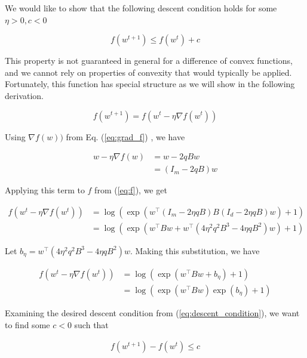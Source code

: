 \documentclass[11pt]{article}
\begin{document}
We would like to show that the following descent condition holds for some $\eta > 0, c < 0$

\begin{equation}
\label{eq:descent_condition}
    f(w^{t+1}) \leq f(w^t) + c
\end{equation}

This property is not guaranteed in general for a difference of convex functions, and we cannot rely on properties of convexity that would typically be applied. Fortunately, this function has special structure as we will show in the following derivation.

\begin{equation}
    f(w^{t+1}) = f(w^t - \eta \nabla f(w^t)) 
\end{equation}

Using $\nabla f(w))$ from Eq. (\ref{eq:grad_f}) , we have

\begin{align*}
    w - \eta \nabla f(w) &= w - 2qBw \\
    &= (I_m - 2qB)w
\end{align*}

Applying this term to $f$ from (\ref{eq:f}), we get

\begin{equation}
\begin{split}
    f(w^t - \eta \nabla f(w^t)) 
    &= \log(\exp(w^{\top}(I_m - 2 \eta qB)B(I_d - 2 \eta qB)w) + 1) \\
    &= \log(\exp(w^{\top}Bw + w^{\top} ( 4 \eta^2 q^2 B^3 - 4 \eta q B^2)w) + 1)
\end{split}
\end{equation}

Let $b_\eta = w^{\top} ( 4 \eta^2 q^2 B^3 - 4 \eta q B^2)w$. Making this substitution, we have

\begin{equation}
\begin{split}
    f(w^t - \eta \nabla f(w^t)) 
    &= \log(\exp(w^{\top}Bw + b_\eta ) + 1) \\
    &= \log(\exp(w^{\top}Bw)\exp(b_\eta ) + 1)
\end{split}
\end{equation}

Examining the desired descent condition from (\ref{eq:descent_condition}), we want to find some $c < 0$ such that

\begin{align*}
    f(w^{t+1}) - f(w^t) \leq c
\end{align*}
\end{document}
